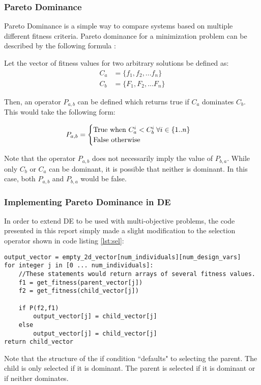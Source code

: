 \subsubsection{Pareto Dominance}
Pareto Dominance is a simple way to compare systems based on multiple different fitness criteria. Pareto dominance for a minimization problem can be described by the following formula \cite{diff-evol}: 

Let the vector of fitness values for two arbitrary solutions be defined as:
\begin{align*}
	C_a &= \{ f_1, f_2, ... f_n \}\\
	C_b &= \{ F_1, F_2, ... F_n\}
\end{align*}

Then, an operator $P_{a,b}$ can be defined which returns true if $C_a$ dominates $C_b$. This would take the following form:

\begin{equation}
P_{a,b} = \begin{cases}
          \hbox{True  when  } C_{a}^i < C_{b}^i \; \forall i \in \{1..n\}\\ 
          \hbox{False otherwise}
          \end{cases}
\end{equation}

Note that the operator $P_{a,b}$ does not necessarily imply the value of $P_{b,a}$. While only $C_b$ or $C_a$ can be dominant, it is possible that neither is dominant. In this case, both $P_{a,b}$ and $P_{b,a}$ would be false\cite{diff-evol}. 

\subsubsection{Implementing Pareto Dominance in DE}

In order to extend DE to be used with multi-objective problems, the code presented in this report simply made a slight modification to the selection operator shown in code listing \ref{lst:sel}:

\begin{lstlisting}[label=lst:modsel,caption=Modified Selection Operator,captionpos=b]
output_vector = empty_2d_vector[num_individuals][num_design_vars]
for integer j in [0 ... num_individuals]:
    //These statements would return arrays of several fitness values. 
    f1 = get_fitness(parent_vector[j])
    f2 = get_fitness(child_vector[j])

    if P(f2,f1)
        output_vector[j] = child_vector[j]
    else
        output_vector[j] = child_vector[j]
return child_vector
\end{lstlisting}
Note that the structure of the if condition ``defaults" to selecting the parent. The child is only selected if it is dominant. The parent is selected if it is dominant or if neither dominates. 

